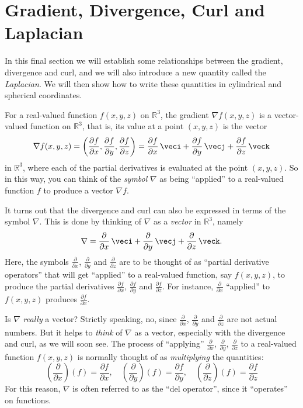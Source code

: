 \section{Gradient, Divergence, Curl and Laplacian}

In this final section we will establish some relationships between the gradient, divergence and curl, and we will also introduce a new quantity called the \emph{Laplacian}. We will then show how to write these quantities in cylindrical and spherical coordinates.

For a real-valued function $f(x,y,z)$ on $\mathbb{R}^{3}$, the gradient $\nabla f(x,y,z)$ is a vector-valued function on $\mathbb{R}^{3}$, that is, its value at a point $(x,y,z)$ is the vector
\[
 \nabla f(x,y,z) = \left( \frac{\partial f}{\partial x},\frac{\partial f}{\partial y},\frac{\partial f}{\partial z}
  \right) =
 \frac{\partial f}{\partial x}\,\veci + \frac{\partial f}{\partial y}\,\vecj +
 \frac{\partial f}{\partial z}\,\veck
\]
in $\mathbb{R}^{3}$, where each of the partial derivatives is evaluated at the point $(x,y,z)$. So in this way, you can think of the \emph{symbol} $\nabla$ as being ``applied'' to a real-valued function $f$ to produce a vector $\nabla f$.

It turns out that the divergence and curl can also be expressed in terms of the symbol $\nabla$. This is done by thinking of $\nabla$ as a \emph{vector} in $\mathbb{R}^{3}$, namely\index{$\nabla$}
\[
 \nabla = \frac{\partial}{\partial x}\,\veci + \frac{\partial}{\partial y}\,\vecj +
   \frac{\partial}{\partial z}\,\veck .
\]
Here, the symbols $\frac{\partial}{\partial x}$, $ \frac{\partial}{\partial y}$ and $\frac{\partial}{\partial z}$ are to be thought of as ``partial derivative operators'' that will get ``applied'' to a real-valued function, say $f(x,y,z)$, to produce the partial derivatives $\frac{\partial f}{\partial x}$, $\frac{\partial f}{\partial y}$ and $\frac{\partial f}{\partial z}$. For instance, $\frac{\partial}{\partial x}$ ``applied'' to $f(x,y,z)$ produces $\frac{\partial f}{\partial x}$.

Is $\nabla$ \emph{really} a vector? Strictly speaking, no, since $\frac{\partial}{\partial x}$, $\frac{\partial}{\partial y}$ and $\frac{\partial}{\partial z}$ are not actual numbers. But it helps to \emph{think} of $\nabla$ as a vector, especially with the divergence and curl, as we will soon see. The process of ``applying'' $\frac{\partial}{\partial x}$, $\frac{\partial}{\partial y}$, $\frac{\partial}{\partial z}$ to a real-valued function $f(x,y,z)$ is normally thought of as \emph{multiplying} the quantities:
\[
 \left( \frac{\partial}{\partial x} \right) (f) = \frac{\partial f}{\partial x} ,\quad
 \left( \frac{\partial}{\partial y} \right) (f) = \frac{\partial f}{\partial y} ,\quad
 \left( \frac{\partial}{\partial z} \right) (f) = \frac{\partial f}{\partial z}
\]
For this reason, $\nabla$ is often referred to as the ``del operator'', since it ``operates'' on functions.
 
